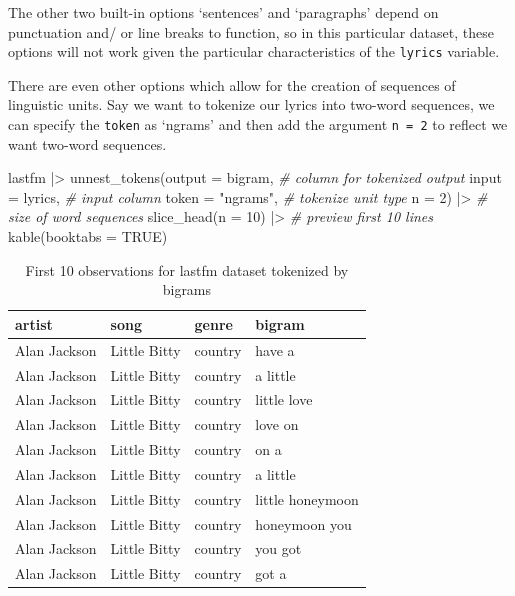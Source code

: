 \documentclass[
  letterpaper,
]{scrbook}
\newenvironment{Shaded}{\begin{snugshade}}{\end{snugshade}}
\newcommand{\AttributeTok}[1]{\textcolor[rgb]{0.00,0.00,0.00}{#1}}
\newcommand{\CommentTok}[1]{\textcolor[rgb]{0.00,0.00,0.00}{\textit{#1}}}
\newcommand{\ConstantTok}[1]{\textcolor[rgb]{0.00,0.00,0.00}{#1}}
\newcommand{\DecValTok}[1]{\textcolor[rgb]{0.00,0.00,0.00}{#1}}
\newcommand{\FunctionTok}[1]{\textcolor[rgb]{0.00,0.00,0.00}{#1}}
\newcommand{\NormalTok}[1]{\textcolor[rgb]{0.00,0.00,0.00}{#1}}
\newcommand{\SpecialCharTok}[1]{\textcolor[rgb]{0.00,0.00,0.00}{#1}}
\newcommand{\StringTok}[1]{\textcolor[rgb]{0.00,0.00,0.00}{#1}}
\begin{document}
The other two built-in options `sentences' and `paragraphs' depend on
punctuation and/ or line breaks to function, so in this particular
dataset, these options will not work given the particular
characteristics of the \texttt{lyrics} variable.

There are even other options which allow for the creation of sequences
of linguistic units. Say we want to tokenize our lyrics into two-word
sequences, we can specify the \texttt{token} as `ngrams' and then add
the argument \texttt{n\ =\ 2} to reflect we want two-word sequences.

\begin{Shaded}
\begin{Highlighting}[]
\NormalTok{lastfm }\SpecialCharTok{|\textgreater{}} 
  \FunctionTok{unnest\_tokens}\NormalTok{(}\AttributeTok{output =}\NormalTok{ bigram, }\CommentTok{\# column for tokenized output}
                \AttributeTok{input =}\NormalTok{ lyrics, }\CommentTok{\# input column}
                \AttributeTok{token =} \StringTok{"ngrams"}\NormalTok{, }\CommentTok{\# tokenize unit type}
                \AttributeTok{n =} \DecValTok{2}\NormalTok{) }\SpecialCharTok{|\textgreater{}}  \CommentTok{\# size of word sequences }
  \FunctionTok{slice\_head}\NormalTok{(}\AttributeTok{n =} \DecValTok{10}\NormalTok{) }\SpecialCharTok{|\textgreater{}}  \CommentTok{\# preview first 10 lines}
  \FunctionTok{kable}\NormalTok{(}\AttributeTok{booktabs =} \ConstantTok{TRUE}\NormalTok{)}
\end{Highlighting}
\end{Shaded}

\hypertarget{tbl-td-lastfm-tokenize-bigrams}{}
\begin{table}
\caption{\label{tbl-td-lastfm-tokenize-bigrams}First 10 observations for lastfm dataset tokenized by bigrams }\tabularnewline

\centering
\begin{tabular}{llll}
\toprule
artist & song & genre & bigram\\
\midrule
Alan Jackson & Little Bitty & country & have a\\
Alan Jackson & Little Bitty & country & a little\\
Alan Jackson & Little Bitty & country & little love\\
Alan Jackson & Little Bitty & country & love on\\
Alan Jackson & Little Bitty & country & on a\\
\addlinespace
Alan Jackson & Little Bitty & country & a little\\
Alan Jackson & Little Bitty & country & little honeymoon\\
Alan Jackson & Little Bitty & country & honeymoon you\\
Alan Jackson & Little Bitty & country & you got\\
Alan Jackson & Little Bitty & country & got a\\
\bottomrule
\end{tabular}
\end{table}
\end{document}
